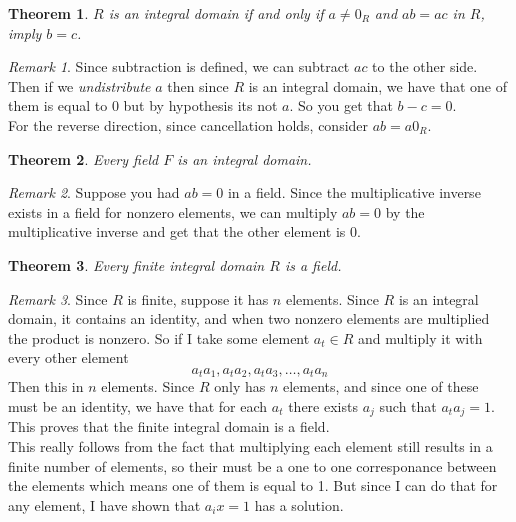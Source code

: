 \documentclass{article}
\newtheorem{theorem}{Theorem}[section]
\theoremstyle{definition}
\theoremstyle{remark}
\newtheorem{remark}{Remark}[section]
\begin{document}
\begin{theorem}\label{thm:cancellation of Multiplication}
$R$ is an integral domain if and only if $a \neq 0_R$ and $ab = ac$ in $R$, imply $b = c$.
\end{theorem}
\begin{remark}
Since subtraction is defined, we can subtract $ac$ to the other side.
Then if we \textit{undistribute} $a$ then since $R$ is an integral 
domain, we have that one of them is equal to 0 but by hypothesis its not $a$. So you get that $b-c=0$.\\
For the reverse direction, since cancellation holds, consider $ab = a0_R$. 
\end{remark}




\begin{theorem}\label{thm:fields are integral domains}
Every field $F$ is an integral domain.
\end{theorem}
\begin{remark}
Suppose you had $ab=0$ in a field. Since 
the multiplicative inverse exists in a field for nonzero elements,
we can multiply $ab=0$ by the multiplicative inverse 
and get that the other element is 0.
\end{remark}




\begin{theorem}\label{thm:finite integral domain is field}
Every finite integral domain $R$ is a field.
\end{theorem}

\begin{remark}
Since $R$ is finite, suppose it has $n$ elements.
Since $R$ is an integral domain, it contains an identity, and 
when two nonzero elements are multiplied the product is nonzero.
So if I take some element $a_t \in R$ and multiply it with every other element
\[
a_ta_1, a_ta_2, a_ta_3, \dots , a_ta_n
\]
Then this in $n$ elements. Since $R$ only has $n$ elements, and since one of these 
must be an identity, we have that for each $a_t$ there exists $a_j$ such that 
$a_ta_j = 1$. This proves that the finite integral domain is a field.\\
This really follows from the fact that multiplying each element
still results in a finite number of elements, so their must be a one to one corresponance between 
the elements which means one of them is equal to 1. But since I can do that for any element, I have shown 
that $a_i x = 1$ has a solution. 
\end{remark}
\end{document}
